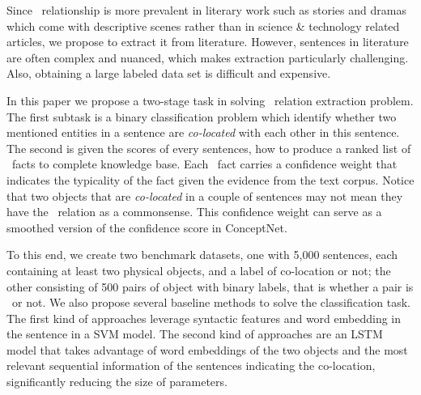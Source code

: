 Since \lnear\ relationship is more prevalent in literary work such as stories 
and dramas which come with descriptive scenes rather
than in science \& technology related articles,
we propose to extract it from literature.
However, sentences in literature are often complex and nuanced, 
which makes extraction particularly challenging. 
Also, obtaining a large labeled data set is difficult and expensive.




In this paper we propose a two-stage task in solving \lnear\ relation
extraction problem. 
The first subtask is a binary classification problem which identify whether two mentioned entities in a sentence are {\em co-located} with each other in this sentence. 
The second is given the scores of every sentences, how to produce a ranked list of \lnear\
facts to complete knowledge base. Each \lnear\ fact carries a confidence weight
that indicates the typicality of the fact given the evidence from the
text corpus. Notice that two objects that are {\em co-located} 
in a couple of sentences may not mean they have 
the \lnear\ relation as a commonsense. This confidence weight can serve
as a smoothed version of the confidence score in ConceptNet.

To this end, we create two 
benchmark datasets, one with 5,000 sentences, 
each containing at least two physical objects,
and a label of co-location or not; the other consisting of 500 pairs of
object with binary labels, that is whether a pair is \lnear\ or not.   
We also propose several baseline methods to solve the classification task.
The first kind of approaches leverage syntactic features and word embedding
in the sentence in a SVM model. The second kind of approaches are an LSTM
model that takes advantage of word embeddings of the 
two objects and the most relevant sequential information of the sentences 
indicating the co-location, significantly reducing the size of 
parameters. 

